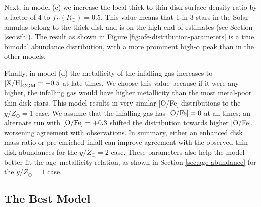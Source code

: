 \documentclass[twocolumn,twocolappendix,linenumbers]{aastex631}
\newcommand{\mathXH}{{\rm [X/H]}}
\newcommand{\mathOFe}{{\rm [O/Fe]}}
\newcommand{\yZ}[1]{$y/Z_\odot=#1$}
\begin{document}
Next, in model (c) we increase the local thick-to-thin disk surface density ratio by a factor of 4 to $f_\Sigma(R_\odot)=0.5$. This value means that 1 in 3 stars in the Solar annulus belong to the thick disk and is on the high end of estimates (see Section \ref{sec:sfh}). The result as shown in Figure \ref{fig:ofe-distribution-parameters} is a true bimodal abundance distribution, with a more prominent high-$\alpha$ peak than in the other models.

Finally, in model (d) the metallicity of the infalling gas increases to $\mathXH_{\rm CGM}=-0.5$ at late times. We choose this value because if it were any higher, the infalling gas would have higher metallicity than the most metal-poor thin disk stars. This model results in very similar [O/Fe] distributions to the $y/Z_\odot=1$ case. We assume that the infalling gas has $\mathOFe=0$ at all times; an alternate run with $\mathOFe=+0.3$ shifted the distribution towards higher [O/Fe], worsening agreement with observations. In summary, either an enhanced disk mass ratio or pre-enriched infall can improve agreement with the observed thin disk abundances for the \yZ{2} case. These parameters also help the model better fit the age--metallicity relation, as shown in Section \ref{sec:age-abundance} for the \yZ{1} case.

\subsection{The Best Model}
\label{sec:ofe-feh-best}
\end{document}
